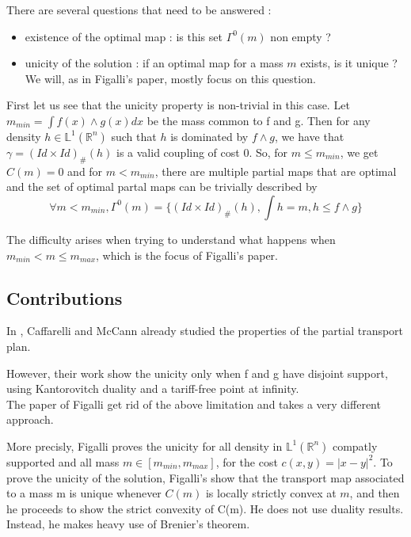 \documentclass[a4paper,11pt]{article}
\theoremstyle{definition}
\begin{document}
There are several questions that need to be answered : 
\begin{itemize}
    \item existence of the optimal map : is this set $\Gamma^0(m)$ non empty  ? 
    \item unicity of the solution : if an optimal map for a mass $m$ exists, is it unique ? We will, as in Figalli's paper, mostly focus on this question.
\end{itemize}

First let us see that the unicity property is non-trivial in this case. Let $m_{min} = \int{f(x)\wedge g(x) dx}$ be the mass common to f and g. Then for any density $h \in \mathbb L^1(\mathbb R^n)$ such that $h$ is dominated by $f \wedge g$, we have that $\gamma = (Id\times Id)_\# (h)$ is a valid coupling of cost $0$. So, for $m \leq m_{min}$, we get $C(m) = 0$ and for $m < m_{min}$, there are multiple partial maps that are optimal and the set of optimal partal maps can be trivially described by $$\forall m < m_{min} ,
 \Gamma^0(m) = \{(Id\times Id)_\# (h),  \int h = m, h\leq f\wedge g\}$$


The difficulty arises when trying to understand what happens when $m_{min} < m \leq m_{max}$, which is the focus of Figalli's paper. \\



\subsection{Contributions}

In \cite{caff}, Caffarelli and McCann already studied the properties of the partial transport plan. 

However, their work show the unicity only when f and g have disjoint support, using Kantorovitch duality and a tariff-free point at infinity. \\

The paper of Figalli get rid of the above limitation and takes a very different approach.

More precisly, Figalli proves the unicity for all density in $\mathbb{L}^1(\mathbb R^n)$ compatly supported and all mass $m \in [m_{min},m_{max}]$, for the cost $c(x,y) = |x-y|^2$. To prove the unicity of the solution, Figalli's show that the transport map associated to a mass m is unique whenever $C(m)$ is locally strictly convex at $m$, and then he proceeds to show the strict convexity of C(m). He does not use duality results. Instead, he makes heavy use of Brenier's theorem.
\end{document}
